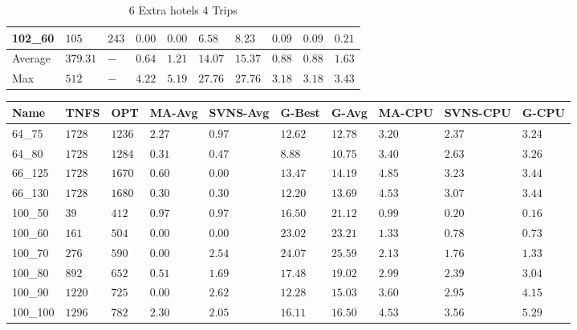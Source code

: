 \begin{center}
\begin{table}[]
\begin{adjustwidth}{-0.4in}{-1in}
\begin{tabular}{|lll|l|l|ll|lll|}
102\_60 & $105   $& $243 $ & $\bm{0.00}$ & $\bm{0.00}$   & $6.58 $  & $8.23$  & $0.09$ & $0.09$ & $0.21$ \\
\hline
Average & $379.31$& $-   $ & $0.64$ & $1.21$   & $14.07$  & $15.37$ & $0.88$ & $0.88$ & $1.63$ \\
Max     & $512   $& $-   $ & $4.22$ & $5.19$   & $27.76$  & $27.76$ & $3.18$ & $3.18$ & $3.43$ \\
\hline
\end{tabular}
    \end{adjustwidth}
    \caption{6 Extra hotels 4 Trips}
    \label{6-4}
    \end{table}
\end{center}
\begin{center}
    \begin{table}[]
    \centering
    \begin{adjustwidth}{-0.4in}{-1in}
    \begin{tabular}{|lll|l|l|ll|lll|}
\hline
Name    & TNFS     & OPT    & MA-Avg & SVNS-Avg & G-Best & G-Avg & MA-CPU & SVNS-CPU & G-CPU \\
\hline
64\_75  & $1728   $& $1236$ & $2.27$ & $0.97$   & $12.62$    & $12.78$   & $3.20 $& $2.37$   & $3.24$ \\
64\_80  & $1728   $& $1284$ & $0.31$ & $0.47$   & $8.88$    & $10.75$   & $3.40 $& $2.63$   & $3.26$ \\
\hline
66\_125 & $1728   $& $1670$ & $0.60$ & $\bm{0.00}$   & $13.47$    & $14.19$   & $4.85 $& $3.23$   & $3.44$ \\
66\_130 & $1728   $& $1680$ & $0.30$ & $0.30$   & $12.20$    & $13.69$   & $4.53 $& $3.07$   & $3.44$ \\
\hline
100\_50 & $39     $& $412 $ & $0.97$ & $0.97$   & $16.50$    & $21.12$   & $0.99 $& $0.20$   & $0.16$ \\
100\_60 & $161    $& $504 $ & $\bm{0.00}$ & $\bm{0.00}$   & $23.02$    & $23.21$   & $1.33 $& $0.78$   & $0.73$ \\
100\_70 & $276    $& $590 $ & $\bm{0.00}$ & $2.54$   & $24.07$    & $25.59$   & $2.13 $& $1.76$   & $1.33$ \\
100\_80 & $892    $& $652 $ & $0.51$ & $1.69$   & $17.48$    & $19.02$   & $2.99 $& $2.39$   & $3.04$ \\
100\_90 & $1220   $& $725 $ & $\bm{0.00}$ & $2.62$   & $12.28$    & $15.03$   & $3.60 $& $2.95$   & $4.15$ \\
100\_100& $1296   $& $782 $ & $2.30$ & $2.05$   & $16.11$    & $16.50$   & $4.53 $& $3.56$   & $5.29$ \\

\end{tabular}
\end{adjustwidth}
\end{table}
\end{center}
